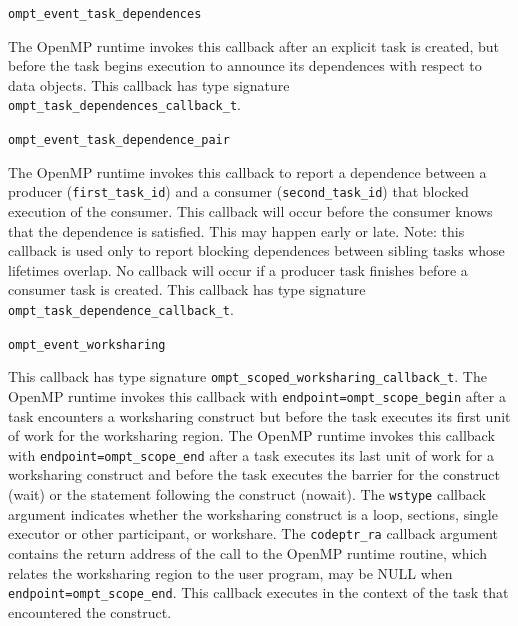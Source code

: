 \documentclass{article}
\newcommand{\descheader}[1]{{\needspace{3\baselineskip}\vspace{1em}\noindent \fbox{#1}}}
\begin{document}
\begin{description}
\sloppy


\item \verb|ompt_event_task_dependences|

  The OpenMP runtime invokes this callback after an explicit task is created, 
  but before the task begins execution to announce its dependences with respect to data objects. 
  This callback has type signature \verb|ompt_task_dependences_callback_t|.
  
\item \verb|ompt_event_task_dependence_pair|

The OpenMP runtime invokes this callback to report a dependence between a producer (\verb|first_task_id|) 
and a consumer (\verb|second_task_id|) that blocked execution of the consumer.
This callback will occur before the consumer knows that the dependence is satisfied. This may happen early or late.
Note: this callback is used only to report blocking dependences between sibling tasks whose lifetimes overlap. 
No callback will occur if a producer task finishes before a consumer task is created.
This callback has type signature \verb|ompt_task_dependence_callback_t|. 
\end{description}


\descheader{Worksharing}

\begin{description}

\item \verb|ompt_event_worksharing|

\sloppy
This callback has type signature \verb|ompt_scoped_worksharing_callback_t|.
The OpenMP runtime invokes this callback with \verb|endpoint=ompt_scope_begin| after a task encounters a worksharing 
construct but before the task executes its first unit of work for the worksharing region. 
The OpenMP runtime invokes this callback with \verb|endpoint=ompt_scope_end| after a task executes 
its last unit of work for a worksharing construct and before the task executes the barrier  for the construct (wait) or the statement following the construct (nowait).
The \verb|wstype| callback argument indicates whether the worksharing construct is a loop, sections, single executor or other participant, 
or workshare.
The \verb|codeptr_ra| callback argument contains the return address of the call to the OpenMP runtime routine, which relates the worksharing region to the user program,
may be NULL when \verb|endpoint=|\verb|ompt_scope_end|.
This callback executes in the context of the task that encountered the construct. 

\end{description}
\end{document}
